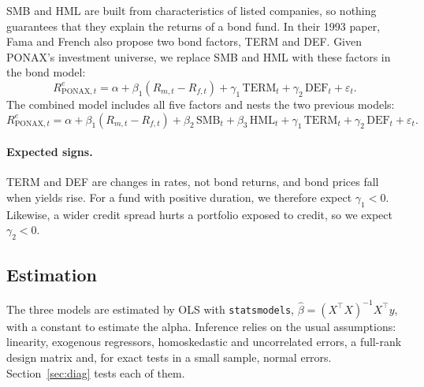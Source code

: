 \documentclass[11pt,a4paper]{article}
\begin{document}
SMB and HML are built from characteristics of listed companies, so nothing guarantees that they explain the returns of a bond fund. In their 1993 paper, Fama and French also propose two bond factors, TERM and DEF. Given PONAX's investment universe, we replace SMB and HML with these factors in the bond model:
\begin{equation}
R^e_{\text{PONAX},t} = \alpha + \beta_1 (R_{m,t} - R_{f,t}) + \gamma_1\,\text{TERM}_t + \gamma_2\,\text{DEF}_t + \varepsilon_t.
\end{equation}
The combined model includes all five factors and nests the two previous models:
\begin{equation}
R^e_{\text{PONAX},t} = \alpha + \beta_1 (R_{m,t} - R_{f,t}) + \beta_2\,\text{SMB}_t + \beta_3\,\text{HML}_t + \gamma_1\,\text{TERM}_t + \gamma_2\,\text{DEF}_t + \varepsilon_t.
\end{equation}

\paragraph{Expected signs.} TERM and DEF are changes in rates, not bond returns, and bond prices fall when yields rise. For a fund with positive duration, we therefore expect $\gamma_1 < 0$. Likewise, a wider credit spread hurts a portfolio exposed to credit, so we expect $\gamma_2 < 0$.

\subsection{Estimation}

The three models are estimated by OLS with \texttt{statsmodels}, $\hat{\beta} = (X^\top X)^{-1} X^\top y$, with a constant to estimate the alpha. Inference relies on the usual assumptions: linearity, exogenous regressors, homoskedastic and uncorrelated errors, a full-rank design matrix and, for exact tests in a small sample, normal errors. Section~\ref{sec:diag} tests each of them.
\end{document}
